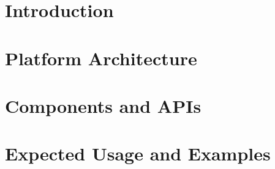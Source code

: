 \documentclass{SmartReport}
\begin{document}
\newpage


\section{Introduction}
\label{sec:intro}


\newpage


\section{Platform Architecture}
\label{sec:arch}

\newpage

% 

% 


\section{Components and APIs}
\label{sec:sw}

\newpage

\section{Expected Usage and Examples}
\label{sec:val}

\newpage
\end{document}
